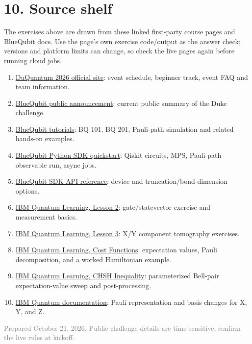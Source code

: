 \documentclass[11pt,letterpaper]{article}
\begin{document}
\section*{10. Source shelf}
The exercises above are drawn from these linked first-party course pages and BlueQubit docs. Use the page's own exercise code/output as the answer check; versions and platform limits can change, so check the live pages again before running cloud jobs.
\begin{enumerate}[label={\textbf{S\arabic*.}},leftmargin=2.8em]
  \item \href{https://duquantum.org/}{DuQuantum 2026 official site}: event schedule, beginner track, event FAQ and team information.
  \item \href{https://qa.linkedin.com/company/bluequbit}{BlueQubit public announcement}: current public summary of the Duke challenge.
  \item \href{https://app.bluequbit.io/tutorials}{BlueQubit tutorials}: BQ 101, BQ 201, Pauli-path simulation and related hands-on examples.
  \item \href{https://app.bluequbit.io/sdk-docs/index.html}{BlueQubit Python SDK quickstart}: Qiskit circuits, MPS, Pauli-path observable run, async jobs.
  \item \href{https://app.bluequbit.io/sdk-docs/bluequbit.sdk.html}{BlueQubit SDK API reference}: device and truncation/bond-dimension options.
  \item \href{https://learning.quantum.ibm.com/course/utility-scale-quantum-computing/lesson-02-bits-gates-and-circuits}{IBM Quantum Learning, Lesson 2}: gate/statevector exercise and measurement basics.
  \item \href{https://learning.quantum.ibm.com/course/utility-scale-quantum-computing/lesson-03-teleportation}{IBM Quantum Learning, Lesson 3}: X/Y component tomography exercises.
  \item \href{https://learning.quantum.ibm.com/course/variational-algorithm-design/cost-functions}{IBM Quantum Learning, Cost Functions}: expectation values, Pauli decomposition, and a worked Hamiltonian example.
  \item \href{https://learning.quantum.ibm.com/tutorial/chsh-inequality}{IBM Quantum Learning, CHSH Inequality}: parameterized Bell-pair expectation-value sweep and post-processing.
  \item \href{https://quantum.cloud.ibm.com/docs/en/guides/specify-observables-pauli}{IBM Quantum documentation}: Pauli representation and basis changes for X, Y, and Z.
\end{enumerate}

\vfill
\begin{center}\small\textcolor{gray}{Prepared October 21, 2026. Public challenge details are time-sensitive; confirm the live rules at kickoff.}\end{center}
\end{document}
